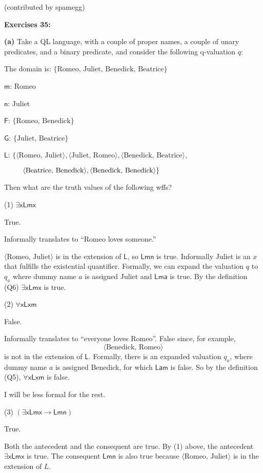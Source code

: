 \documentclass[14pt]{extarticle}
\begin{document}
(contributed by spamegg)

{\bf Exercises 35:}

{\bf(a)} Take a QL language, with a couple of proper names, a couple of unary predicates, and a binary predicate, and consider the following q-valuation $q$:

The domain is: $\{\text{Romeo, Juliet, Benedick, Beatrice}\}$

$\mathsf{m}$: Romeo

$\mathsf{n}$: Juliet

$\mathsf{F}$: $\{\text{Romeo, Benedick}\}$

$\mathsf{G}$: $\{\text{Juliet, Beatrice}\}$

$\mathsf{L}$: $\{\langle\text{Romeo, Juliet}\rangle, \langle\text{Juliet, Romeo}\rangle, \langle\text{Benedick, Beatrice}\rangle, $

$\hspace{0.9cm}\langle\text{Beatrice, Benedick}\rangle, \langle\text{Benedick, Benedick}\rangle\}$

Then what are the truth values of the following wffs?

(1) $\mathsf{\exists xLmx}$

True. 

Informally translates to ``Romeo loves someone.''

$\langle\text{Romeo, Juliet}\rangle$ is in the extension of $\mathsf{L}$, so $\mathsf{Lmn}$ is true. Informally Juliet is an $x$ that fulfills the existential quantifier. Formally, we can expand the valuation $q$ to $q_a$ where dummy name $a$ is assigned Juliet and $\mathsf{Lma}$ is true. By the definition (Q6) $\mathsf{\exists xLmx}$ is true.

(2) $\mathsf{\forall xLxm}$

False.

Informally translates to ``everyone loves Romeo''. False since, for example, 
$$
\langle \text{Benedick, Romeo}\rangle
$$ 
is not in the extension of $\mathsf{L}$. Formally, there is an expanded valuation $q_a$, where dummy name $a$ is assigned Benedick, for which $\mathsf{Lam}$ is false. So by the definition (Q5), $\mathsf{\forall xLxm}$ is false.

I will be less formal for the rest.

(3) $(\mathsf{\exists xLmx\to Lmn})$

True. 

Both the antecedent and the consequent are true. By (1) above, the antecedent $\mathsf{\exists xLmx}$ is true. The consequent $\mathsf{Lmn}$ is also true because $\langle \text{Romeo, Juliet}\rangle$ is in the extension of $L$.
\end{document}

